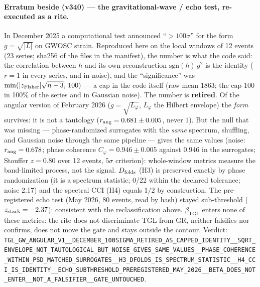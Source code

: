 \documentclass[11pt]{article}
\newcommand{\bTGL}{\beta_{\mathrm{TGL}}}\newcommand{\Msun}{M_{\odot}}\newcommand{\TGL}{\mathrm{TGL}}
\theoremstyle{definition}\newtheorem{deriv}{Derivation}
\begin{document}
\paragraph*{Erratum beside (v340) --- the gravitational-wave / echo test, re-executed as a rite.} In December 2025 a computational test announced ``$>100\sigma$'' for the form $g=\sqrt{|L|}$ on GWOSC strain. Reproduced here on the local windows of 12 events (23 series; sha256 of the files in the manifest), the number is what the code said: the correlation between $h$ and its own reconstruction $\mathrm{sgn}(h)\,g^2$ is the identity ($r=1$ in every series, and in noise), and the ``significance'' was $\min(|z_{\rm Fisher}|\sqrt{n-3},\,100)$ --- a cap in the code itself (raw mean 1863; the cap 100 in 100\% of the series and in Gaussian noise). The number is \textbf{retired}. Of the angular version of February 2026 ($g=\sqrt{L_\varphi}$, $L_\varphi$ the Hilbert envelope) the \emph{form} survives: it is not a tautology ($r_{\rm ang}=0.681\pm0.005$, never $1$). But the null that was missing --- phase-randomized surrogates with the \emph{same} spectrum, shuffling, and Gaussian noise through the same pipeline --- gives the same values (noise: $r_{\rm ang}=0.678$; phase coherence $C_\varphi=0.946\pm0.005$ against 0.946 in the surrogates; Stouffer $z=0.80$ over 12 events, $5\sigma$ criterion): whole-window metrics measure the band-limited process, not the signal. $D_{\rm folds}$ (H3) is preserved exactly by phase randomization (it is a spectrum statistic; 0/22 within the declared tolerance; noise 2.17) and the spectral CCI (H4) equals $1/2$ by construction. The pre-registered echo test (May 2026, 80 events, read by hash) stayed sub-threshold ($z_{\rm stack}=-2.37$): consistent with the reclassification above. $\bTGL$ enters none of these metrics: the rite does not discriminate TGL from GR, neither falsifies nor confirms, does not move the gate and stays outside the contour. Verdict: \texttt{TGL\_GW\_ANGULAR\_V1\_\_DECEMBER\_100SIGMA\_RETIRED\_AS\_CAPPED\_IDENTITY\_\_SQRT\_ENVELOPE\_NOT\_TAUTOLOGICAL\_BUT\_NOISE\_GIVES\_SAME\_VALUES\_\_PHASE\_COHERENCE\_WITHIN\_PSD\_MATCHED\_SURROGATES\_\_H3\_DFOLDS\_IS\_SPECTRUM\_STATISTIC\_\_H4\_CCI\_IS\_IDENTITY\_\_ECHO\_SUBTHRESHOLD\_PREREGISTERED\_MAY\_2026\_\_BETA\_DOES\_NOT\_ENTER\_\_NOT\_A\_FALSIFIER\_\_GATE\_UNTOUCHED}.
\end{document}
